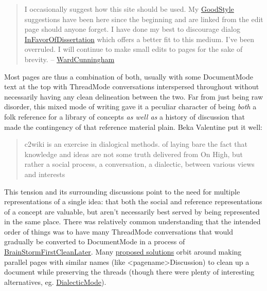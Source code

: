 \begin{quote}
I occasionally suggest how this site should be used. My
\href{http://wiki.c2.com/?GoodStyle}{GoodStyle} suggestions have been
here since the beginning and are linked from the edit page should anyone
forget. I have done my best to discourage dialog
\href{http://wiki.c2.com/?InFavorOfDissertation}{InFavorOfDissertation}
which offers a better fit to this medium. I've been overruled. I will
continue to make small edits to pages for the sake of brevity. --
\href{http://wiki.c2.com/?WardCunningham}{WardCunningham} \citep{C2wikiWikiHistory} 
\end{quote}

Most pages are thus a combination of both, usually with some
DocumentMode text at the top with ThreadMode conversations interspersed
throughout without necessarily having any clean delineation between the
two. Far from just being raw disorder, this mixed mode of writing gave
it a peculiar character of being \emph{both} a folk reference for a
library of concepts \emph{as well as} a history of discussion that made
the contingency of that reference material plain. Beka Valentine put it
well:

\begin{quote}
c2wiki is an exercise in dialogical methods. of laying bare the fact
that knowledge and ideas are not some truth delivered from On High, but
rather a social process, a conversation, a dialectic, between various
views and interests \citep{valentineC2wikiExerciseDialogical2021} 
\end{quote}

This tension and its surrounding discussions point to the need for
multiple representations of a single idea: that both the social and
reference representations of a concept are valuable, but aren't
necessarily best served by being represented in the same place. There
was relatively common understanding that the intended order of things
was to have many ThreadMode conversations that would gradually be
converted to DocumentMode in a process of
\href{http://wiki.c2.com/?BrainStormFirstCleanLater}{BrainStormFirstCleanLater}.
Many \href{http://wiki.c2.com/?ConvertThreadModeToDocumentMode}{proposed
solutions} orbit around making parallel pages with similar names (like
\textless pagename\textgreater Discussion) to clean up a document while
preserving the threads (though there were plenty of interesting
alternatives, eg.
\href{http://wiki.c2.com/?DialecticMode}{DialecticMode}).


